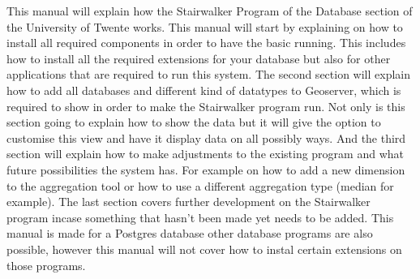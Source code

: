 This manual will explain how the Stairwalker Program of the Database section of the University of Twente works. This manual will start by explaining on how to install all required components in order to have the basic running. This includes how to install all the required extensions for your database but also for other applications that are required to run this system. The second section will explain how to add all databases and different kind of datatypes to Geoserver, which is required to show in order to make the Stairwalker program run. Not only is this section going to explain how to show the data but it will give the option to customise this view and have it display data on all possibly ways. And the third section will explain how to make adjustments to the existing program and what future possibilities the system has. For example on how to add a new dimension to the aggregation tool or how to use a different aggregation type (median for example). The last section covers further development on the Stairwalker program incase something that hasn't been made yet needs to be added. This manual is made for a Postgres database other database programs are also possible, however this manual will not cover how to instal certain extensions on those programs.